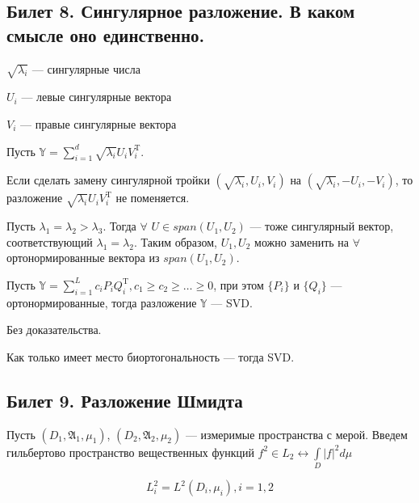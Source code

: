 \subsection{Билет 8. Сингулярное разложение. В каком смысле оно единственно.}

\begin{design}[1]
$\sqrt{\lambda_i}$ --- сингулярные числа
\end{design}
\begin{design}[2]
$U_i$ --- левые сингулярные вектора
\end{design}
\begin{design}[3]
$V_i$ --- правые сингулярные вектора
\end{design}

Пусть $\mathbb{Y} = \sum \limits_{i = 1}^d \sqrt{\lambda_i} U_i V_i^{\mathrm{T}}$.

Если сделать замену сингулярной тройки $(\sqrt{\lambda_i}, U_i, V_i)$ на $(\sqrt{\lambda_i}, -U_i, -V_i)$, то разложение $\sqrt{\lambda_i} U_i V_i^{\mathrm{T}}$ не поменяется.

Пусть $\lambda_1 = \lambda_2 > \lambda_3$. Тогда $\forall$ $U \in span(U_1, U_2)$ --- тоже сингулярный вектор, соответствующий $\lambda_1 = \lambda_2$. Таким образом, $U_1, U_2$ можно заменить на $\forall$ ортонормированные вектора из $span(U_1,U_2)$.

\begin{sug}
Пусть $\mathbb{Y} = \sum \limits_{i = 1}^L c_i P_i Q_i^{\mathrm{T}}, c_1 \geqslant c_2 \geqslant \dots \geqslant 0$, при этом $\{P_i\}$ и $\{Q_i\}$ --- ортонормированные, тогда разложение $\mathbb{Y}$ --- SVD.
\end{sug}

Без доказательства.

\begin{note}
Как только имеет место биортогональность --- тогда SVD.
\end{note}


\subsection{Билет 9. Разложение Шмидта}

Пусть $(D_1, \mathfrak{A}_1, \mu_1)$, $(D_2, \mathfrak{A}_2, \mu_2)$ --- измеримые пространства с мерой. Введем гильбертово пространство вещественных функций $f^2 \in L_2 \leftrightarrow \int \limits_{D} |f|^2 d\mu$

\begin{equation*}
L_i^2 = L^2(D_i,\mu_i), i = 1,2
\end{equation*}

